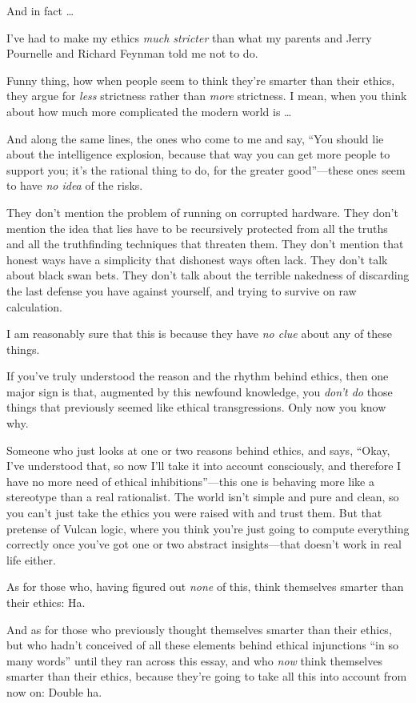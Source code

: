 {
 And in fact \ldots}

{
 I've had to make my ethics \textit{much stricter}
than what my parents and Jerry Pournelle and Richard Feynman told me
not to do.}

{
 Funny thing, how when people seem to think they're
smarter than their ethics, they argue for \textit{less} strictness
rather than \textit{more} strictness. I mean, when you think about how
much more complicated the modern world is \ldots}

{
 And along the same lines, the ones who come to me and say,
``You should lie about the intelligence explosion,
because that way you can get more people to support you;
it's the rational thing to do, for the greater
good''---these ones seem to have \textit{no idea} of
the risks.}

{
 They don't mention the problem of running on
corrupted hardware. They don't mention the idea that
lies have to be recursively protected from all the truths and all the
truthfinding techniques that threaten them. They don't
mention that honest ways have a simplicity that dishonest ways often
lack. They don't talk about black swan bets. They
don't talk about the terrible nakedness of discarding
the last defense you have against yourself, and trying to survive on
raw calculation.}

{
 I am reasonably sure that this is because they have \textit{no
clue} about any of these things.}

{
 If you've truly understood the reason and the
rhythm behind ethics, then one major sign is that, augmented by this
newfound knowledge, you \textit{don't do} those things
that previously seemed like ethical transgressions. Only now you know
why.}

{
 Someone who just looks at one or two reasons behind ethics, and
says, ``Okay, I've understood that, so
now I'll take it into account consciously, and
therefore I have no more need of ethical
inhibitions''---this one is behaving more like a
stereotype than a real rationalist. The world isn't
simple and pure and clean, so you can't just take the
ethics you were raised with and trust them. But that pretense of Vulcan
logic, where you think you're just going to compute
everything correctly once you've got one or two
abstract insights---that doesn't work in real life
either.}

{
 As for those who, having figured out \textit{none} of this, think
themselves smarter than their ethics: Ha.}

{
 And as for those who previously thought themselves smarter than
their ethics, but who hadn't conceived of all these
elements behind ethical injunctions ``in so many
words'' until they ran across this essay, and who
\textit{now} think themselves smarter than their ethics, because
they're going to take all this into account from now
on: Double ha.}

